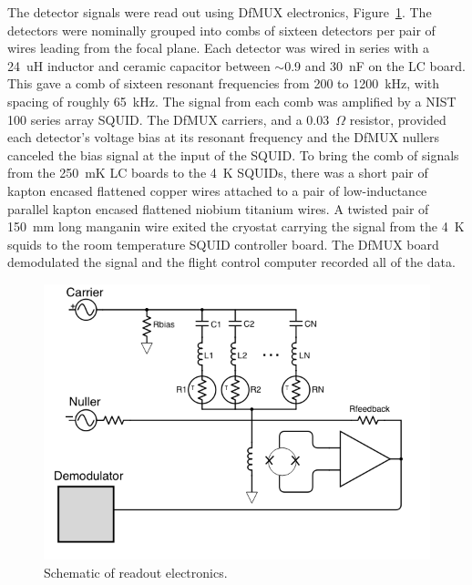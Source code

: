 The detector signals were read out using \ac{DfMUX} electronics, Figure~\ref{fig:dfmux}.
The detectors were nominally grouped into combs of sixteen detectors per pair of wires leading from the focal plane. 
Each detector was wired in series with a 24~uH inductor and ceramic capacitor between $\sim$0.9 and 30~nF on the \ac{LC} board. 
This gave a comb of sixteen resonant frequencies from 200 to 1200~kHz, with spacing of roughly 65~kHz. 
The signal from each comb was amplified by a NIST 100 series array \ac{SQUID}. 
The \ac{DfMUX} carriers, and a 0.03~$\Omega$ resistor, provided each detector's voltage bias at its resonant frequency and the \ac{DfMUX} nullers canceled the bias signal at the input of the \ac{SQUID}. 
To bring the comb of signals from the 250~mK \ac{LC} boards to the 4~K \ac{SQUID}s, there was a short pair of kapton encased flattened copper wires attached to a pair of low-inductance parallel kapton encased flattened niobium titanium wires.
A twisted pair of 150~mm long manganin wire exited the cryostat carrying the signal from the 4~K squids to the room temperature \ac{SQUID} controller board. 
The \ac{DfMUX} board demodulated the signal and the flight control computer recorded all of the data. 

\begin{figure}[htbp]
\begin{center}
\includegraphics[width=0.6\columnwidth]{figures/dfmux_schematic.png}
\caption[DFMUX schematic]{Schematic of readout electronics. 
\label{fig:dfmux} }
\end{center}
\end{figure}


